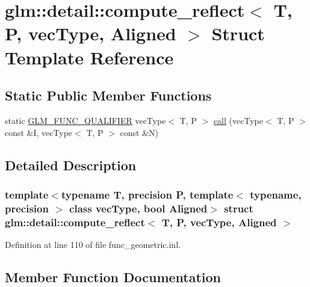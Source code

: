 \hypertarget{structglm_1_1detail_1_1compute__reflect}{}\section{glm\+::detail\+::compute\+\_\+reflect$<$ T, P, vec\+Type, Aligned $>$ Struct Template Reference}
\label{structglm_1_1detail_1_1compute__reflect}
\subsection*{Static Public Member Functions}
\begin{DoxyCompactItemize}
\item 
static \mbox{\hyperlink{setup_8hpp_a33fdea6f91c5f834105f7415e2a64407}{G\+L\+M\+\_\+\+F\+U\+N\+C\+\_\+\+Q\+U\+A\+L\+I\+F\+I\+ER}} vec\+Type$<$ T, P $>$ \mbox{\hyperlink{structglm_1_1detail_1_1compute__reflect_acab5e79e2afbcaead9bbc47776877e5a}{call}} (vec\+Type$<$ T, P $>$ const \&I, vec\+Type$<$ T, P $>$ const \&N)
\end{DoxyCompactItemize}


\subsection{Detailed Description}
\subsubsection*{template$<$typename T, precision P, template$<$ typename, precision $>$ class vec\+Type, bool Aligned$>$\newline
struct glm\+::detail\+::compute\+\_\+reflect$<$ T, P, vec\+Type, Aligned $>$}



Definition at line 110 of file func\+\_\+geometric.\+inl.



\subsection{Member Function Documentation}
\mbox{\label{structglm_1_1detail_1_1compute__reflect_acab5e79e2afbcaead9bbc47776877e5a}} 
